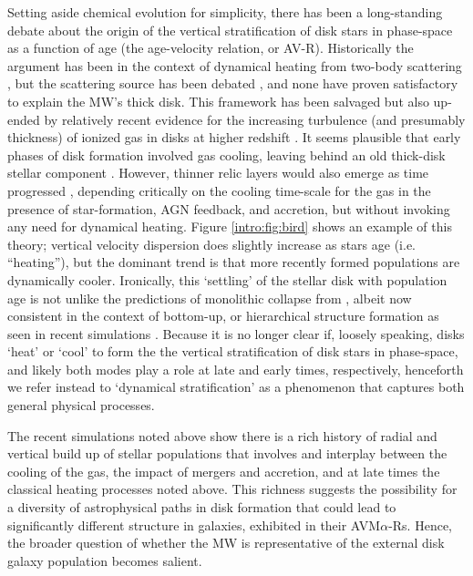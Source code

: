 Setting aside chemical evolution for simplicity, there has been a
long-standing debate about the origin of the vertical stratification
of disk stars in phase-space as a function of age (the age-velocity
relation, or AV-R). Historically the argument has been in the context
of dynamical heating from two-body scattering \citep{Spitzer51}, but
the scattering source has been debated \citep[e.g., giant molecular
clouds, transient spiral structure, or dwarf satellite
galaxies][]{Spitzer51,Spitzer53,Wielen77,Quinn93,Binney00}, and none
have proven satisfactory to explain the MW's thick disk.  This
framework has been salvaged but also up-ended by relatively recent
evidence for the increasing turbulence (and presumably thickness) of
ionized gas in disks at higher redshift
\citep{Weiner06,Forster-Schreiber09,Wisnioski15}. It seems plausible
that early phases of disk formation involved gas cooling, leaving
behind an old thick-disk stellar component
\citep{Brook04,Bournaud09}. However, thinner relic layers would also
emerge as time progressed \citep{Bird13}, depending critically on the
cooling time-scale for the gas in the presence of star-formation, AGN
feedback, and accretion, but without invoking any need for dynamical
heating. Figure \ref{intro:fig:bird} shows an example of this theory;
vertical velocity dispersion does slightly increase as stars age
(i.e. ``heating''), but the dominant trend is that more recently
formed populations are dynamically cooler. Ironically, this `settling'
of the stellar disk with population age is not unlike the predictions
of monolithic collapse from \citet{ELS}, albeit now consistent in the
context of bottom-up, or hierarchical structure formation as seen in
recent simulations \citep[e.g.,][]{Bird13,Martig14a}.  Because it is
no longer clear if, loosely speaking, disks `heat' or `cool' to form
the the vertical stratification of disk stars in phase-space, and
likely both modes play a role at late and early times, respectively,
henceforth we refer instead to `dynamical stratification' as a
phenomenon that captures both general physical processes.

The recent simulations noted above show there is a rich history of
radial and vertical build up of stellar populations that involves and
interplay between the cooling of the gas, the impact of mergers and
accretion, and at late times the classical heating processes noted
above.  This richness suggests the possibility for a diversity of
astrophysical paths in disk formation that could lead to significantly
different structure in galaxies, exhibited in their
AVM$\alpha$-Rs. Hence, the broader question of whether the MW is
representative of the external disk galaxy population becomes salient.

